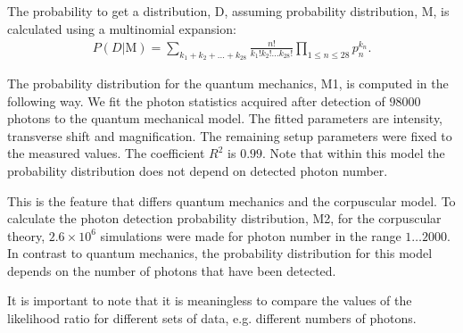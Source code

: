 \documentclass[prl,reprint,twocolumn,amsmath,preprintnumbers,amssymb,superscriptaddress]{revtex4-1}
\begin{document}
The probability to get a distribution, D, assuming probability distribution, M, is calculated using a multinomial expansion:
\begin{eqnarray}
P(D|\text{M})=\sum_{k_1+k_2+...+k_{28}} \frac{n!}{{k_1}!{k_2}!...{k_{28}}!} \prod_{1\leq n \leq28}^{} p_n^{k_n}.
\end{eqnarray}

The probability distribution for the quantum mechanics, M1, is computed in the following way. We fit the photon statistics acquired after detection of $98000$ photons to the quantum mechanical model. The fitted parameters are intensity, transverse shift and magnification. The remaining setup parameters were fixed to the measured values. The coefficient $R^2$ is  $0.99$. Note that within this model the probability distribution does not depend on detected photon number.

This is the feature that differs quantum mechanics and the corpuscular model. To calculate the photon detection probability distribution, M2, for the corpuscular theory, $2.6\times 10^6$ simulations were made for photon number in the range $1\dots 2000$. In contrast to quantum mechanics, the probability distribution for this model depends on the number of photons that have been detected. 

It is important to note that it is meaningless to compare the values of the likelihood ratio for different sets of data, e.g. different numbers of photons. 
\end{document}
